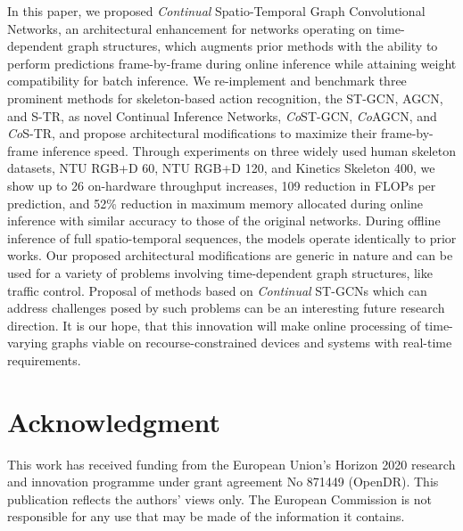 \documentclass[journal]{IEEEtran}
\theoremstyle{definition}
\begin{document}
In this paper, we proposed \textit{Continual} Spatio-Temporal Graph Convolutional Networks, an architectural enhancement for
networks operating on time-dependent graph structures, 
which augments prior methods with the ability to perform predictions frame-by-frame during online inference while attaining weight compatibility for batch inference. We re-implement and benchmark three prominent methods {for skeleton-based action recognition}, the ST-GCN, AGCN, and S-TR, as novel Continual Inference Networks, \textit{Co}ST-GCN, \textit{Co}AGCN, and \textit{Co}S-TR, and propose architectural modifications to maximize their frame-by-frame inference speed.
Through experiments on three widely used human skeleton datasets, NTU RGB+D 60, NTU RGB+D 120, and Kinetics Skeleton 400, we show up to 26 on-hardware throughput increases, 109 reduction in FLOPs per prediction, and 52\% reduction in maximum memory allocated during online inference with similar accuracy to those of the original networks.
{During offline inference of full spatio-temporal sequences, the models operate identically to prior works.}
Our proposed architectural modifications are generic in nature and can be used for a variety of problems involving time-dependent graph structures, like traffic control. 
Proposal of methods based on \textit{Continual} ST-GCNs which can address challenges posed by such problems can be an interesting future research direction.
{It is our hope, that this innovation will make online processing of time-varying graphs viable} on recourse-constrained devices and systems with real-time requirements. \section*{Acknowledgment}
This work has received funding from the European Union’s Horizon 2020 research and innovation programme under grant agreement No 871449 (OpenDR). This publication reflects the authors’ views only. The European Commission is not responsible for any use that may be made of the information it contains. 













\renewcommand*{\bibfont}{\small}


\end{document}
